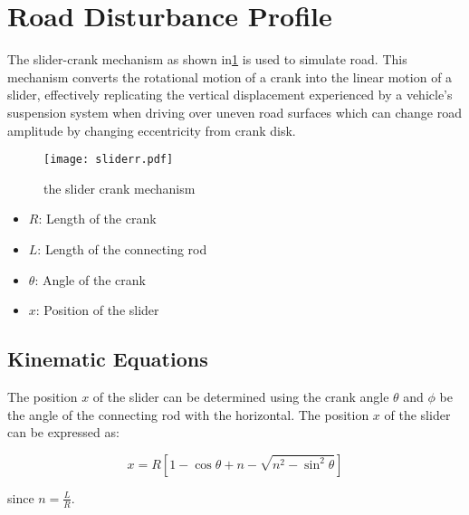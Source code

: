 \section{Road Disturbance Profile}
The slider-crank mechanism as shown in\ref{fig:sliderr} is used to simulate road. This mechanism converts the rotational motion of a crank into the linear motion of a slider, effectively replicating the vertical displacement experienced by a vehicle's suspension system when driving over uneven road surfaces which can change road amplitude by changing eccentricity from crank disk.
\begin{figure}[H]
	\centering
	\texttt{[image: sliderr.pdf]}
	\caption{the slider crank mechanism}
	\label{fig:sliderr}
\end{figure}

\begin{itemize}
	\item $R$: Length of the crank
	\item $L$: Length of the connecting rod
	\item $\theta $: Angle of the crank 
	\item $x$: Position of the slider
\end{itemize}
\newpage
\subsection*{Kinematic Equations}

The position \( x \) of the slider can be determined using the crank angle \( \theta \) and \( \phi \) be the angle of the connecting rod with the horizontal. The position \( x \) of the slider can be expressed as:


\begin{equation}
	x = R \left[ 1 - \cos \theta + n - \sqrt{n^2 - \sin^2 \theta} \right] 
\end{equation}

since \( n = \frac{L}{R} \).